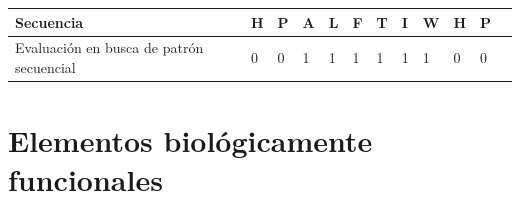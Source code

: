 \vspace{0.3cm}
\noindent
\begin{center}
\begin{adjustbox}{width=\textwidth}
\begin{tabular}{llllllllllll} 
\hline    
Secuencia & \textbf{H} & \textbf{P} & \textbf{A} & \textbf{L} & \textbf{F} & \textbf{T} & \textbf{I} & \textbf{W} & \textbf{H} &\textbf{P}  \\ \hline
Evaluación en busca de patrón secuencial & 0 & 0 & 1 & 1 & 1 & 1 & 1 & 1 & 0 & 0 \\ \hline
\end{tabular}
\end{adjustbox}
\end{center}






































































\section{Elementos biológicamente funcionales}\label{evaluacionFuncional}

